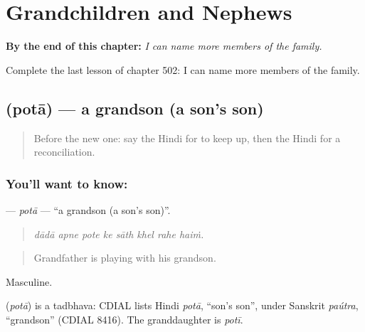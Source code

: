 
\chapter{Grandchildren and Nephews}
\label{ch:hi-grandchildren-and-nephews}

\begin{chapteropening}
\textbf{By the end of this chapter:} \emph{I can name more members of the family.}

Complete the last lesson of chapter 502: I can name more members of the family.
\end{chapteropening}

\section[\texorpdfstring{\hi{पोता} (potā)}{पोता (potā)}]{ (potā) — a grandson (a son's son)}

\label{lesson:HI-C502-pota}



\begin{quote}
Before the new one: say the Hindi for to keep up, then the Hindi for a reconciliation.
\end{quote}

\subsection*{You'll want to know: }
\textbf{} — \emph{potā} — \textquotedblleft{}a grandson (a son's son)\textquotedblright{}.

\begin{quote}
       
\end{quote}

\begin{quote}
\emph{dādā apne pote ke sāth khel rahe haiṁ.}
\end{quote}

\begin{quote}
Grandfather is playing with his grandson.
\end{quote}

Masculine.

\begin{cousinweb}
\textbf{} (\emph{potā}) is a tadbhava: CDIAL lists Hindi \emph{potā}, \textquotedblleft{}son's son\textquotedblright{}, under Sanskrit \emph{paútra}, \textquotedblleft{}grandson\textquotedblright{} (CDIAL 8416). The granddaughter is \emph{potī}.
\end{cousinweb}

